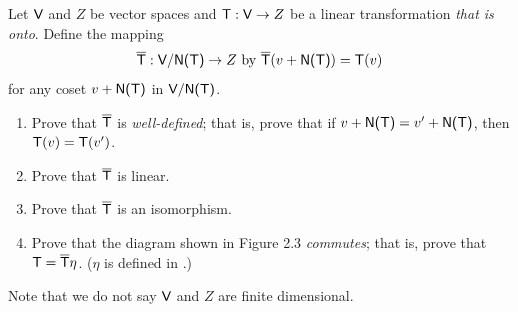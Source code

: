 \begin{exercise} \label{exercise 2.4.24}
Let \(\textsf{V}\) and \(Z\) be vector spaces and \(\textsf{T} : \textsf{V} \to Z\) be a linear transformation \emph{that is onto}.
Define the mapping
\[
    \overline{\textsf{T}} : \textsf{V} / \textsf{N(T)} \to Z \text{ by } \overline{\textsf{T}}(v + \textsf{N(T)}) = \textsf{T}(v)
\]
for any coset \(v + \textsf{N(T)}\) in \(\textsf{V} / \textsf{N(T)}\).
\begin{enumerate}
\item Prove that \(\overline{\textsf{T}}\) is \emph{well-defined};
    that is, prove that if \(v + \textsf{N(T)} = v' + \textsf{N(T)}\), then \(\textsf{T}(v) = \textsf{T}(v')\).
\item Prove that \(\overline{\textsf{T}}\) is linear.
\item Prove that \(\overline{\textsf{T}}\) is an isomorphism.
\item Prove that the diagram shown in Figure 2.3 \emph{commutes};
    that is, prove that \(\textsf{T} = \overline{\textsf{T}} \eta\). (\(\eta\) is defined in .)
\end{enumerate}

Note that we do not say \(\textsf{V}\) and \(Z\) are finite dimensional.
\end{exercise}

